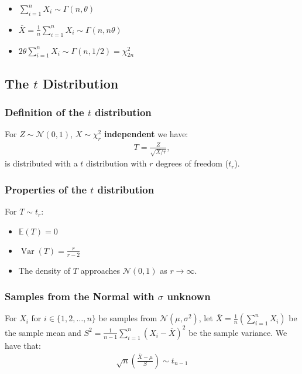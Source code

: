 \documentclass[a4paper, 12pt, twoside]{article}
\DeclareMathOperator{\Var}{Var}
\begin{document}
\begin{itemize}
    \item $\sum_{i = 1}^n X_i \sim \Gamma(n, \theta)$
    \item $\overline{X} = \frac{1}{n} \sum_{i = 1}^n X_i \sim \Gamma(n, n\theta)$
    \item $2\theta \sum_{i = 1}^n X_i \sim \Gamma(n, 1/2) = \chi^2_{2n}$
\end{itemize}

\newpage

\subsection{The $t$ Distribution}

\subsubsection{Definition of the $t$ distribution}

For $Z \sim \mathcal{N}(0, 1)$, $X \sim \chi^2_r$ \textbf{independent} we have:
\begin{align*}
    T = \frac{Z}{\sqrt{X / r}},
\end{align*}
is distributed with a $t$ distribution with $r$ degrees of freedom ($t_r$).

\subsubsection{Properties of the $t$ distribution}

For $T \sim t_r$:

\begin{itemize}
    \item $\mathbb{E}(T) = 0$
    \item $\Var(T) = \frac{r}{r - 2}$
    \item The density of $T$ approaches $\mathcal{N}(0, 1)$ as $r\to\infty$.
\end{itemize}

\subsubsection{Samples from the Normal with $\sigma$ unknown}

For $X_i$ for $i \in \{1, 2, \ldots, n\}$ be samples from
$\mathcal{N}(\mu, \sigma^2)$, let $\overline{X} = \frac{1}{n}
    (\sum_{i = 1}^n X_i)$ be the sample mean and $S^2 = \frac{1}{n - 1}
    \sum_{i = 1}^n(X_i - \overline{X})^2$ be the sample variance. We have that:
\begin{align*}
    \sqrt{n}\left(\frac{\overline{X} - \mu}{S}\right) \sim t_{n - 1}
\end{align*}
\end{document}
